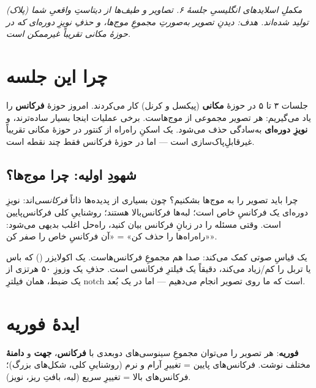 \documentclass[12pt,a4paper]{article}
\begin{document}

{\small\itshape مکملِ اسلایدهای انگلیسیِ جلسهٔ ۶. تصاویر و طیف‌ها از دیتاستِ واقعیِ شما (پلاک) تولید شده‌اند. هدف: دیدنِ تصویر به‌صورتِ مجموعِ موج‌ها، و حذفِ نویزِ دوره‌ای که در حوزهٔ مکانی تقریباً غیرممکن است.}

\vspace{0.5cm}
\tableofcontents
\vspace{1cm}

\section{چرا این جلسه}

جلسات ۳ تا ۵ در حوزهٔ \textbf{مکانی} (پیکسل و کرنل) کار می‌کردند. امروز حوزهٔ \textbf{فرکانس} را
یاد می‌گیریم: هر تصویر مجموعی از موج‌هاست. برخی عملیات اینجا بسیار ساده‌ترند، و \textbf{نویزِ
دوره‌ای} به‌سادگی حذف می‌شود. یک اسکنِ راه‌راه از کنتور در حوزهٔ مکانی تقریباً غیرقابلِ‌پاک‌سازی
است — اما در حوزهٔ فرکانس فقط چند نقطه است.

\subsection{شهودِ اولیه: چرا موج‌ها؟}

چرا باید تصویر را به موج‌ها بشکنیم؟ چون بسیاری از پدیده‌ها ذاتاً \emph{فرکانسی}‌اند: نویزِ دوره‌ای
یک فرکانسِ خاص است؛ لبه‌ها فرکانس‌بالا هستند؛ روشناییِ کلی فرکانس‌پایین است. وقتی مسئله را در زبانِ
فرکانس بیان کنید، راه‌حل اغلب بدیهی می‌شود: «راه‌راه‌ها را حذف کن» = «آن فرکانسِ خاص را صفر کن».

یک قیاسِ صوتی کمک می‌کند: صدا هم مجموعِ فرکانس‌هاست. یک اکولایزر () که باس یا تربل
را کم/زیاد می‌کند، دقیقاً یک فیلترِ فرکانسی است. حذفِ یک وزوزِ ۵۰ هرتزی از یک ضبط، همان فیلترِ
notch است که ما روی تصویر انجام می‌دهیم — اما در یک بُعد.

\section{ایدهٔ فوریه}

\textbf{فوریه}: هر تصویر را می‌توان مجموعِ سینوسی‌های دوبعدی با \textbf{فرکانس}، \textbf{جهت} و
\textbf{دامنهٔ} مختلف نوشت. فرکانس‌های پایین = تغییرِ آرام و نرم (روشناییِ کلی، شکل‌های بزرگ)؛
فرکانس‌های بالا = تغییرِ سریع (لبه، بافتِ ریز، نویز).
\end{document}
